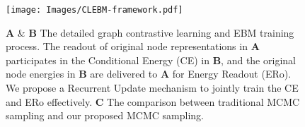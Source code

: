 
\begin{figure}
    \centering
    \texttt{[image: Images/CLEBM-framework.pdf]}
    \vspace{-24pt}
    \caption{
    \textbf{A} \& \textbf{B} The detailed graph contrastive learning and EBM training process. 
    The readout of original node representations in \textbf{A} participates in the Conditional Energy (CE) in \textbf{B}, 
    and the original node energies in \textbf{B} are delivered to \textbf{A} for Energy Readout (ERo). 
    We propose a Recurrent Update mechanism to jointly train the CE and ERo effectively. 
    \textbf{C} The comparison between traditional MCMC sampling and our proposed MCMC sampling. 
    }
    \label{fig:framework}
    \vspace{-6mm}
\end{figure}